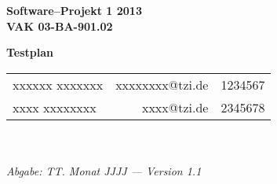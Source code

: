 \documentclass[fontsize=12pt,paper=a4,twoside]{scrartcl}
\begin{document}
  \thispagestyle{fancy}
  \fancyhead[LO,RE]{ }
  \fancyfoot[C]{}

  \vspace{3cm}

  \begin{minipage}[H]{\textwidth}
  \begin{center}
  \bf
  \Large
  Software--Projekt 1 2013\\
  \smallskip
  \small
  VAK 03-BA-901.02\\
  \vspace{3cm}
  \end{center}
  \end{minipage}
  \begin{minipage}[H]{\textwidth}
  \begin{center}
  \vspace{1cm}
  \bf
  \Large Testplan\\
  \vfill
  \end{center}
  \end{minipage}
  \vfill
  \begin{minipage}[H]{\textwidth}
  \begin{center}
  \sf
  \begin{tabular}{lrr}
  xxxxxx xxxxxxx & xxxxxxxx@tzi.de & 1234567\\
  xxxx xxxxxxxx & xxxx@tzi.de & 2345678\\
  \end{tabular}
  \\ ~
  \vspace{2cm}
  \\
  \it Abgabe: TT. Monat JJJJ --- Version 1.1\\ ~
  \end{center}
  \end{minipage}



\newpage

  \thispagestyle{fancy}
  \fancyhead{}
  \fancyfoot{}
  \renewcommand{\headrulewidth}{0.4pt}
  \tableofcontents
\end{document}
